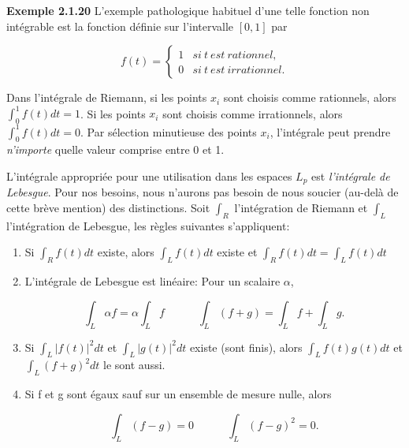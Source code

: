 \documentclass[11pt,twoside,a4paper]{article}
\begin{document}
\begin{enumerate}

  \noindent
  \textbf{Exemple 2.1.20} L'exemple pathologique habituel d'une telle fonction non intégrable est la fonction définie sur l'intervalle $[0, 1]$ par

  \begin{equation}
    f(t) = \begin{cases} 1 & si \ t \ est \ rationnel, \\
      0 &  si \ t \ est \ irrationnel.
          \end{cases}
  \end{equation}

  \noindent
  Dans l'intégrale de Riemann, si les points $x_i$ sont choisis comme rationnels, alors $\int_{0}^{1}f(t)dt = 1$. Si les points $x_i$ sont choisis comme irrationnels, alors $\int_{0}^{1}f(t)dt = 0$. Par sélection minutieuse des points $x_i$, l'intégrale peut prendre \textit{n'importe} quelle valeur comprise entre 0 et 1.
  \vspace{4mm}

  \noindent
  L'intégrale appropriée pour une utilisation dans les espaces $L_p$ est \textit{l'intégrale de Lebesgue}. Pour nos besoins, nous n'aurons pas besoin de nous soucier (au-delà de cette brève mention) des distinctions. Soit $\int_{R}$ l'intégration de Riemann et $\int_{L}$ l'intégration de Lebesgue, les règles suivantes s'appliquent:

  \begin{enumerate}
    \item Si $\int_{R}f(t)dt$ existe, alors $\int_{L}f(t)dt$ existe et $\int_{R}f(t)dt = \int_{L}f(t)dt$
    \item L'intégrale de Lebesgue est linéaire: Pour un scalaire $\alpha$,
    
    \begin{equation*}
      \int_L \alpha f = \alpha \int_L f  \quad \quad \quad  \int_L (f + g) = \int_L f + \int_L g .
    \end{equation*}

    \item Si $\int_L |f(t)|^2 dt$ et $\int_L |g(t)|^2 dt$ existe (sont finis), alors $\int_L f(t)g(t)dt$ et $\int_L (f+g)^2 dt$ le sont aussi.
    \item Si f et g sont égaux sauf sur un ensemble de mesure nulle, alors
    
    \begin{equation*}
      \int_L (f - g) = 0  \quad \quad \quad  \int_L (f - g)^2 = 0.
    \end{equation*}


\end{enumerate}
\end{enumerate}
\end{document}
